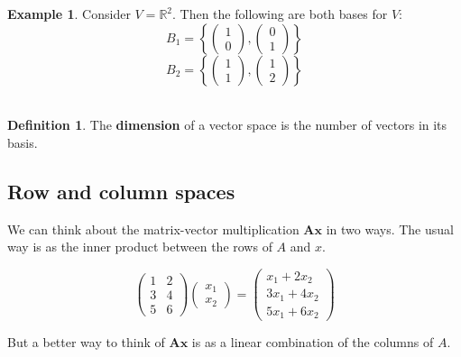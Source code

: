 \documentclass[]{book}
\theoremstyle{definition}
\newtheorem{definition}{Definition}[chapter]
\theoremstyle{definition}
\newtheorem{example}{Example}[chapter]
\theoremstyle{definition}
\theoremstyle{remark}
\begin{document}
\begin{example}
\protect\hypertarget{exm:basisRp}{}{\label{exm:basisRp} }Consider \(V=\mathbb{R}^2\). Then the following are both bases for \(V\):
\[B_1=\left\{\left(\begin{array}{c}1\\0\end{array}\right), \left(\begin{array}{c}0\\1\end{array}\right)\right\}
\]
\[B_2=\left\{\left(\begin{array}{c}1\\1\end{array}\right), \left(\begin{array}{c}1\\2\end{array}\right)\right\}
\]\\
\end{example}

\begin{definition}
\protect\hypertarget{def:dimension}{}{\label{def:dimension} }The \textbf{dimension} of a vector space is the number of vectors in its basis.
\end{definition}

\hypertarget{colsspace}{%
\subsection{Row and column spaces}\label{colsspace}}

We can think about the matrix-vector multiplication \(\mathbf A\mathbf x\) in two ways. The usual way is as the inner product between the rows of \(A\) and \(x\).

\[ \left( \begin{array}{cc} 1 & 2\\ 3&4\\5&6\end{array}\right) \left(\begin{array}{c}x_1\\ x_2\end{array}\right) = \left(\begin{array}{c} x_1+2x_2\\3x_1+4x_2\\5x_1+6x_2\end{array}\right)\]

But a better way to think of \(\mathbf A\mathbf x\) is as a linear combination of the columns of \(A\).
\end{document}

